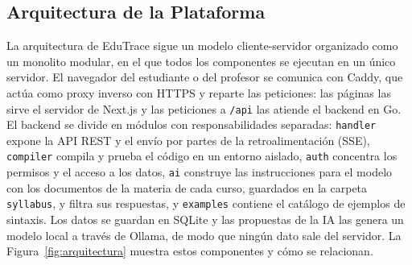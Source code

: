 \documentclass[letterpaper, 10 pt, conference]{ieeeconf}
\begin{document}
\subsection{Arquitectura de la Plataforma}
La arquitectura de EduTrace sigue un modelo cliente-servidor organizado como un monolito modular, en el que todos los componentes se ejecutan en un único servidor.
El navegador del estudiante o del profesor se comunica con Caddy, que actúa como proxy inverso con HTTPS y reparte las peticiones: las páginas las sirve el servidor de Next.js y las peticiones a \texttt{/api} las atiende el backend en Go.
El backend se divide en módulos con responsabilidades separadas: \texttt{handler} expone la API REST y el envío por partes de la retroalimentación (SSE), \texttt{compiler} compila y prueba el código en un entorno aislado, \texttt{auth} concentra los permisos y el acceso a los datos, \texttt{ai} construye las instrucciones para el modelo con los documentos de la materia de cada curso, guardados en la carpeta \texttt{syllabus}, y filtra sus respuestas, y \texttt{examples} contiene el catálogo de ejemplos de sintaxis.
Los datos se guardan en SQLite y las propuestas de la IA las genera un modelo local a través de Ollama, de modo que ningún dato sale del servidor.
La Figura~\ref{fig:arquitectura} muestra estos componentes y cómo se relacionan.
\end{document}
